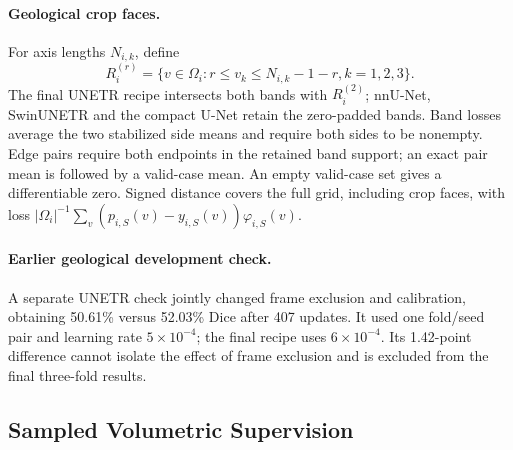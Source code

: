 \documentclass[12pt,a4paper]{article}
\begin{document}
\paragraph{Geological crop faces.}\label{sec:geo-boundaries}
For axis lengths $N_{i,k}$, define
\begin{equation}
R_i^{(r)}=\{v\in\Omega_i:r\leq v_k\leq N_{i,k}-1-r, k=1,2,3\}.
\label{eq:geological-band-frame}
\end{equation}
The final UNETR recipe intersects both bands with $R_i^{(2)}$;
nnU-Net, SwinUNETR and the compact U-Net retain the zero-padded bands.
Band losses average the two stabilized side means and require both
sides to be nonempty. Edge pairs require both endpoints in the retained
band support; an exact pair mean is followed by a valid-case mean.
An empty valid-case set gives a differentiable zero. Signed distance
covers the full grid, including crop faces, with loss
$|\Omega_i|^{-1}\sum_v(p_{i,S}(v)-y_{i,S}(v))\varphi_{i,S}(v)$.

\paragraph{Earlier geological development check.}\label{sec:geo-development}
A separate UNETR check jointly changed frame exclusion and calibration,
obtaining 50.61\% versus 52.03\% Dice after 407
updates. It used one fold/seed pair and learning rate $5\times10^{-4}$;
the final recipe uses $6\times10^{-4}$. Its 1.42-point difference
cannot isolate the effect of frame exclusion and is excluded from the
final three-fold results.

\subsection{Sampled Volumetric Supervision}
\label{sec:sampled-pretrained-supervision}
\end{document}
